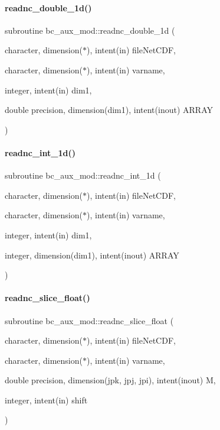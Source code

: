 \paragraph{\texorpdfstring{readnc\+\_\+double\+\_\+1d()}{readnc\_double\_1d()}}
{\footnotesize\ttfamily subroutine bc\+\_\+aux\+\_\+mod\+::readnc\+\_\+double\+\_\+1d (\begin{DoxyParamCaption}\item[{character, dimension($\ast$), intent(in)}]{file\+Net\+C\+DF,  }\item[{character, dimension($\ast$), intent(in)}]{varname,  }\item[{integer, intent(in)}]{dim1,  }\item[{double precision, dimension(dim1), intent(inout)}]{A\+R\+R\+AY }\end{DoxyParamCaption})}

\mbox{\label{namespacebc__aux__mod_aa7b33e356dcb9e7b401b43449826fcd7}} 
\paragraph{\texorpdfstring{readnc\+\_\+int\+\_\+1d()}{readnc\_int\_1d()}}
{\footnotesize\ttfamily subroutine bc\+\_\+aux\+\_\+mod\+::readnc\+\_\+int\+\_\+1d (\begin{DoxyParamCaption}\item[{character, dimension($\ast$), intent(in)}]{file\+Net\+C\+DF,  }\item[{character, dimension($\ast$), intent(in)}]{varname,  }\item[{integer, intent(in)}]{dim1,  }\item[{integer, dimension(dim1), intent(inout)}]{A\+R\+R\+AY }\end{DoxyParamCaption})}

\mbox{\label{namespacebc__aux__mod_aeeaf654e97d1f0eddf0f866614744f32}} 
\paragraph{\texorpdfstring{readnc\+\_\+slice\+\_\+float()}{readnc\_slice\_float()}}
{\footnotesize\ttfamily subroutine bc\+\_\+aux\+\_\+mod\+::readnc\+\_\+slice\+\_\+float (\begin{DoxyParamCaption}\item[{character, dimension($\ast$), intent(in)}]{file\+Net\+C\+DF,  }\item[{character, dimension($\ast$), intent(in)}]{varname,  }\item[{double precision, dimension(jpk, jpj, jpi), intent(inout)}]{M,  }\item[{integer, intent(in)}]{shift }\end{DoxyParamCaption})}


